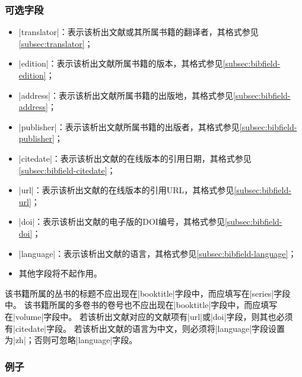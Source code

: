 \subsubsection{可选字段}

\begin{itemize}
\item |translator|：表示该析出文献或其所属书籍的翻译者，其格式参见\ref{subsec:translator}；
\item |edition|：表示该析出文献所属书籍的版本，其格式参见\ref{subsec:bibfield-edition}；
\item |address|：表示该析出文献所属书籍的出版地，其格式参见\ref{subsec:bibfield-address}；
\item |publisher|：表示该析出文献所属书籍的出版者，其格式参见\ref{subsec:bibfield-publisher}；
\item |citedate|：表示该析出文献的在线版本的引用日期，其格式参见\ref{subsec:bibfield-citedate}；
\item |url|：表示该析出文献的在线版本的引用URL，其格式参见\ref{subsec:bibfield-url}；
\item |doi|：表示该析出文献的电子版的DOI编号，其格式参见\ref{subsec:bibfield-doi}；
\item |language|：表示该析出文献的语言，其格式参见\ref{subsec:bibfield-language}；
\item 其他字段将不起作用。
\end{itemize}

\begin{note}
该书籍所属的丛书的标题不应出现在|booktitle|字段中，而应填写在|series|字段中。
该书籍所属的多卷书的卷号也不应出现在|booktitle|字段中，而应填写在|volume|字段中。
若该析出文献对应的文献项有|url|或|doi|字段，则其也必须有|citedate|字段。
若该析出文献的语言为中文，则必须将|language|字段设置为|zh|；否则可忽略|language|字段。
\end{note}

\subsubsection{例子}

